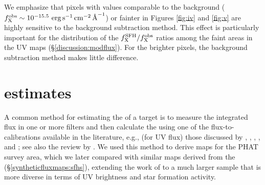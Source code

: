 \documentclass[iop, tighten]{emulateapj}
\begin{document}
We emphasize that pixels with values comparable to the background ($f_{\mathrm{X}}^{\mathrm{obs}} \sim
10^{-15.5}\, \,\mathrm{erg}\,\mathrm{s}^{-1}\,\mathrm{cm}^{-2}\,\textrm{\AA}^{-1}$) or fainter in Figures \ref{fig:iv} and \ref{fig:v} are
highly sensitive to the background subtraction method. This effect is
particularly important for the distribution of the $f_{\mathrm{X}}^{\mathrm{SFH}}/f_{\mathrm{X}}^{\mathrm{obs}}$ ratios among
the faint areas in the UV maps (\S \ref{discussion:modflux}). For the brighter
pixels, the background subtraction method makes little difference.





\section{\sfr{} estimates}\label{sfrestimates}

\figvi

\figvii

A common method for estimating the \sfr{} of a target is to measure the
integrated flux in one or more filters and then calculate the \sfr{} using one
of the flux-to-\sfr{} calibrations available in the literature, e.g., (for UV
flux) those discussed by \citet{Kennicutt:1998}, \citet{Salim:2007},
\citet{Hao:2011}, \citet{Murphy:2011}, and \citet{Leroy:2012}; see also the
review by \citet{Kennicutt:2012}. We used this method to derive \sfr{} maps for
the PHAT survey area, which we later compared with similar maps derived from the
 (\S \ref{syntheticfluxmaps:sfhs}), extending the work of
\citet{Simones:2014} to a much larger sample that is more diverse in terms of UV
brightness and star formation activity.
\end{document}
